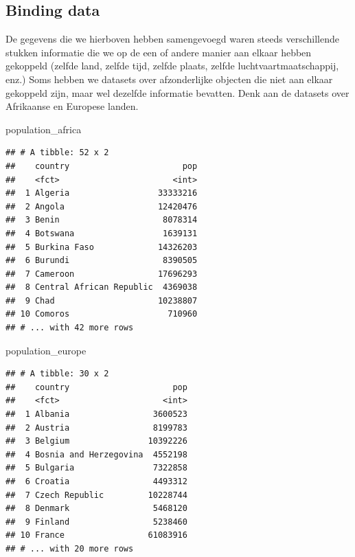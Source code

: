 \documentclass[]{tufte-book}
\newenvironment{Shaded}{}{}
\newcommand{\NormalTok}[1]{#1}
\begin{document}
\hypertarget{binding-data}{%
\subsection{Binding data}\label{binding-data}}

De gegevens die we hierboven hebben samengevoegd waren steeds verschillende stukken informatie die we op de een of andere manier aan elkaar hebben gekoppeld (zelfde land, zelfde tijd, zelfde plaats, zelfde luchtvaartmaatschappij, enz.) Soms hebben we datasets over afzonderlijke objecten die niet aan elkaar gekoppeld zijn, maar wel dezelfde informatie bevatten. Denk aan de datasets over Afrikaanse en Europese landen.

\begin{Shaded}
\begin{Highlighting}[]
\NormalTok{population\_africa}
\end{Highlighting}
\end{Shaded}

\begin{verbatim}
## # A tibble: 52 x 2
##    country                       pop
##    <fct>                       <int>
##  1 Algeria                  33333216
##  2 Angola                   12420476
##  3 Benin                     8078314
##  4 Botswana                  1639131
##  5 Burkina Faso             14326203
##  6 Burundi                   8390505
##  7 Cameroon                 17696293
##  8 Central African Republic  4369038
##  9 Chad                     10238807
## 10 Comoros                    710960
## # ... with 42 more rows
\end{verbatim}

\begin{Shaded}
\begin{Highlighting}[]
\NormalTok{population\_europe}
\end{Highlighting}
\end{Shaded}

\begin{verbatim}
## # A tibble: 30 x 2
##    country                     pop
##    <fct>                     <int>
##  1 Albania                 3600523
##  2 Austria                 8199783
##  3 Belgium                10392226
##  4 Bosnia and Herzegovina  4552198
##  5 Bulgaria                7322858
##  6 Croatia                 4493312
##  7 Czech Republic         10228744
##  8 Denmark                 5468120
##  9 Finland                 5238460
## 10 France                 61083916
## # ... with 20 more rows
\end{verbatim}
\end{document}
